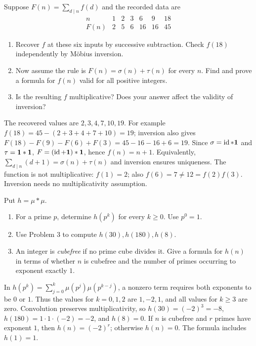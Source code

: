 Suppose $F(n)=\sum_{d\mid n}f(d)$ and the recorded data are
\[
\begin{array}{c|rrrrrr}
n&1&2&3&6&9&18\\\hline
F(n)&2&5&6&16&16&45
\end{array}
\]
\begin{enumerate}
 \item Recover $f$ at these six inputs by successive subtraction.
 Check $f(18)$ independently by M\"obius inversion. 
 \item Now assume the rule is $F(n)=\sigma(n)+\tau(n)$ for every $n$.
 Find and prove a formula for $f(n)$ valid for all positive integers.
 \item Is the resulting $f$ multiplicative? Does your answer affect
 the validity of inversion? 
\end{enumerate}
\begin{solution}
The recovered values are $2,3,4,7,10,19$.
For example $f(18)=45-(2+3+4+7+10)=19$; inversion also gives
$F(18)-F(9)-F(6)+F(3)=45-16-16+6=19$.
Since $\sigma=\operatorname{id}*\mathbf{1}$ and $\tau=\mathbf{1}*\mathbf{1}$,
$F=(\operatorname{id}+\mathbf{1})*\mathbf{1}$, hence $f(n)=n+1$.
Equivalently, $\sum_{d\mid n}(d+1)=\sigma(n)+\tau(n)$ and inversion
ensures uniqueness. The function is not multiplicative: $f(1)=2$;
also $f(6)=7\ne12=f(2)f(3)$. Inversion needs no multiplicativity assumption.
\end{solution}

Put $h=\mu*\mu$.
\begin{enumerate}
 \item For a prime $p$, determine $h(p^k)$ for every $k\ge0$.
 Use $p^0=1$. 
 \item Use Problem 3 to compute $h(30),h(180),h(8)$. 
 \item An integer is \emph{cubefree} if no prime cube divides it.
 Give a formula for $h(n)$ in terms of whether $n$ is cubefree and
 the number of primes occurring to exponent exactly $1$. 
\end{enumerate}
\begin{solution}
In $h(p^k)=\sum_{j=0}^k\mu(p^j)\mu(p^{k-j})$, a nonzero term
requires both exponents to be $0$ or $1$. Thus the values for
$k=0,1,2$ are $1,-2,1$, and all values for $k\ge3$ are zero.
Convolution preserves multiplicativity, so
$h(30)=(-2)^3=-8$, $h(180)=1\cdot1\cdot(-2)=-2$, and $h(8)=0$.
If $n$ is cubefree and $r$ primes have exponent $1$, then $h(n)=(-2)^r$;
otherwise $h(n)=0$. The formula includes $h(1)=1$.
\end{solution}

